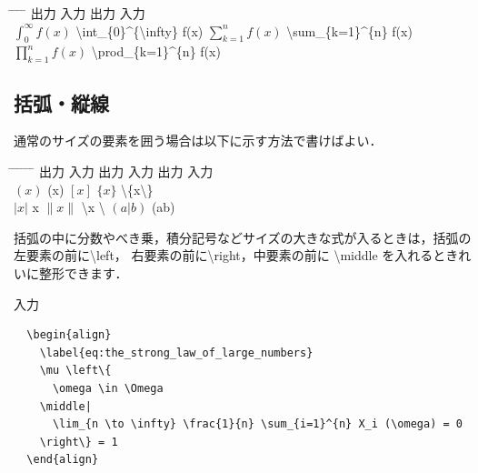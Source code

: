 \documentclass[11pt,a4j,onecolumn]{jsreport} %
\begin{document}
\begin{tabbing}
  \hspace{10truemm} \= \hspace{25truemm} \= \hspace{45truemm} \= \hspace{25truemm} \= \hspace{45truemm} \kill
  \> 出力 \> 入力 \> 出力 \> 入力 \\
  \> $\int_0^\infty f(x)$ \> \textbackslash int\_\{0\}\^{}\{\textbackslash infty\} f(x) \> $\sum_{k=1}^n f(x)$\> \textbackslash sum\_\{k=1\}\^{}\{n\} f(x) \\
  \> $\prod_{k=1}^n f(x)$ \> \textbackslash prod\_\{k=1\}\^{}\{n\} f(x) \\
\end{tabbing}

\subsection{括弧・縦線}

通常のサイズの要素を囲う場合は以下に示す方法で書けばよい．

\begin{tabbing}
  \hspace{20truemm} \= \hspace{10truemm} \= \hspace{30truemm} \= \hspace{10truemm} \= \hspace{30truemm} \= \hspace{10truemm} \= \hspace{20truemm} \kill
  \> 出力 \> 入力 \> 出力 \> 入力 \> 出力 \> 入力 \\
  \> $(x)$ \> (x) \> $[x]$ \> [x] \> $\{x\}$ \> \textbackslash \{x\textbackslash \} \\
  \> $|x|$ \> \textbar x\textbar \> $\| x \|$ \> \textbackslash \textbar x \textbackslash \textbar \> $(a|b)$ \> (a\textbar b) \\
\end{tabbing}

括弧の中に分数やべき乗，積分記号などサイズの大きな式が入るときは，括弧の左要素の前に\textbackslash left，
右要素の前に\textbackslash right，中要素の前に \textbackslash middle を入れるときれいに整形できます．

入力
\begin{verbatim}
  \begin{align}
    \label{eq:the_strong_law_of_large_numbers}
    \mu \left\{
      \omega \in \Omega 
    \middle| 
      \lim_{n \to \infty} \frac{1}{n} \sum_{i=1}^{n} X_i (\omega) = 0
    \right\} = 1
  \end{align}
\end{verbatim}
\end{document}
